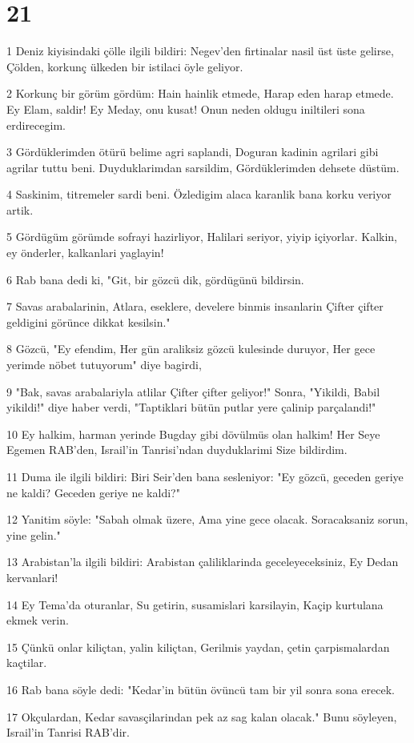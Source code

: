\chapter{21}

\par 1 Deniz kiyisindaki çölle ilgili bildiri: Negev'den firtinalar nasil üst üste gelirse, Çölden, korkunç ülkeden bir istilaci öyle geliyor.
\par 2 Korkunç bir görüm gördüm: Hain hainlik etmede, Harap eden harap etmede. Ey Elam, saldir! Ey Meday, onu kusat! Onun neden oldugu iniltileri sona erdirecegim.
\par 3 Gördüklerimden ötürü belime agri saplandi, Doguran kadinin agrilari gibi agrilar tuttu beni. Duyduklarimdan sarsildim, Gördüklerimden dehsete düstüm.
\par 4 Saskinim, titremeler sardi beni. Özledigim alaca karanlik bana korku veriyor artik.
\par 5 Gördügüm görümde sofrayi hazirliyor, Halilari seriyor, yiyip içiyorlar. Kalkin, ey önderler, kalkanlari yaglayin!
\par 6 Rab bana dedi ki, "Git, bir gözcü dik, gördügünü bildirsin.
\par 7 Savas arabalarinin, Atlara, eseklere, develere binmis insanlarin Çifter çifter geldigini görünce dikkat kesilsin."
\par 8 Gözcü, "Ey efendim, Her gün araliksiz gözcü kulesinde duruyor, Her gece yerimde nöbet tutuyorum" diye bagirdi,
\par 9 "Bak, savas arabalariyla atlilar Çifter çifter geliyor!" Sonra, "Yikildi, Babil yikildi!" diye haber verdi, "Taptiklari bütün putlar yere çalinip parçalandi!"
\par 10 Ey halkim, harman yerinde Bugday gibi dövülmüs olan halkim! Her Seye Egemen RAB'den, Israil'in Tanrisi'ndan duyduklarimi Size bildirdim.
\par 11 Duma ile ilgili bildiri: Biri Seir'den bana sesleniyor: "Ey gözcü, geceden geriye ne kaldi? Geceden geriye ne kaldi?"
\par 12 Yanitim söyle: "Sabah olmak üzere, Ama yine gece olacak. Soracaksaniz sorun, yine gelin."
\par 13 Arabistan'la ilgili bildiri: Arabistan çaliliklarinda geceleyeceksiniz, Ey Dedan kervanlari!
\par 14 Ey Tema'da oturanlar, Su getirin, susamislari karsilayin, Kaçip kurtulana ekmek verin.
\par 15 Çünkü onlar kiliçtan, yalin kiliçtan, Gerilmis yaydan, çetin çarpismalardan kaçtilar.
\par 16 Rab bana söyle dedi: "Kedar'in bütün övüncü tam bir yil sonra sona erecek.
\par 17 Okçulardan, Kedar savasçilarindan pek az sag kalan olacak." Bunu söyleyen, Israil'in Tanrisi RAB'dir.

